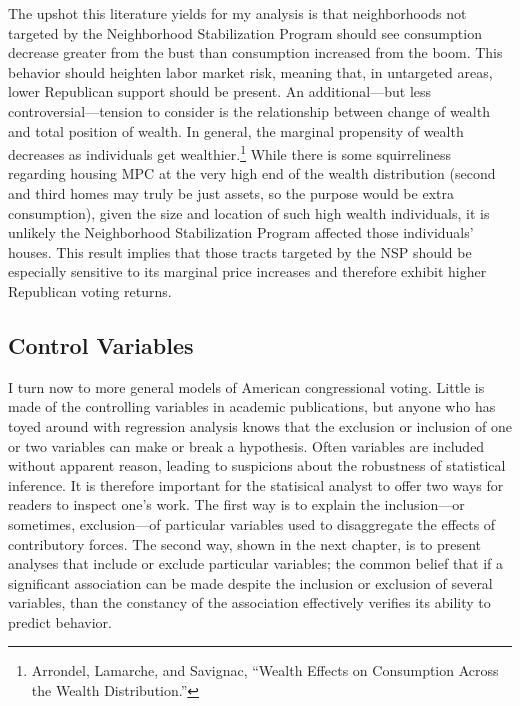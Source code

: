\documentclass[
]{article}
\begin{document}
The upshot this literature yields for my analysis is that neighborhoods not targeted by the Neighborhood Stabilization Program should see consumption decrease greater from the bust than consumption increased from the boom.
This behavior should heighten labor market risk, meaning that, in untargeted areas, lower Republican support should be present.
An additional---but less controversial---tension to consider is the relationship between change of wealth and total position of wealth.
In general, the marginal propensity of wealth decreases as individuals get wealthier.\footnote{Arrondel, Lamarche, and Savignac, ``Wealth Effects on Consumption Across the Wealth Distribution.''}
While there is some squirreliness regarding housing MPC at the very high end of the wealth distribution (second and third homes may truly be just assets, so the purpose would be extra consumption), given the size and location of such high wealth individuals, it is unlikely the Neighborhood Stabilization Program affected those individuals' houses.
This result implies that those tracts targeted by the NSP should be especially sensitive to its marginal price increases and therefore exhibit higher Republican voting returns.

\hypertarget{controls}{%
\subsection{Control Variables}\label{controls}}

I turn now to more general models of American congressional voting.
Little is made of the controlling variables in academic publications, but anyone who has toyed around with regression analysis knows that the exclusion or inclusion of one or two variables can make or break a hypothesis.
Often variables are included without apparent reason, leading to suspicions about the robustness of statistical inference.
It is therefore important for the statisical analyst to offer two ways for readers to inspect one's work.
The first way is to explain the inclusion---or sometimes, exclusion---of particular variables used to disaggregate the effects of contributory forces.
The second way, shown in the next chapter, is to present analyses that include or exclude particular variables; the common belief that if a significant association can be made despite the inclusion or exclusion of several variables, than the constancy of the association effectively verifies its ability to predict behavior.
\end{document}

